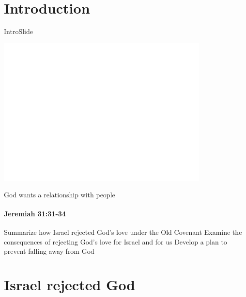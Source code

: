 
\section{Introduction}
\begin{frame}{IntroSlide}
\begin{center}
	\includegraphics[draft, width=0.8\textwidth]{figures/dummy.png}
\end{center}

\end{frame}

\begin{frame}{God wants a relationship with people}
\framesubtitle{Jeremiah 31:31-34}
	
\end{frame}

\begin{goals}
\goal Summarize how Israel rejected God’s love under the Old Covenant
\goal Examine the consequences of rejecting God’s love for Israel and for
us
\goal Develop a plan to prevent falling away from God

\end{goals}

\section{Israel rejected God}

